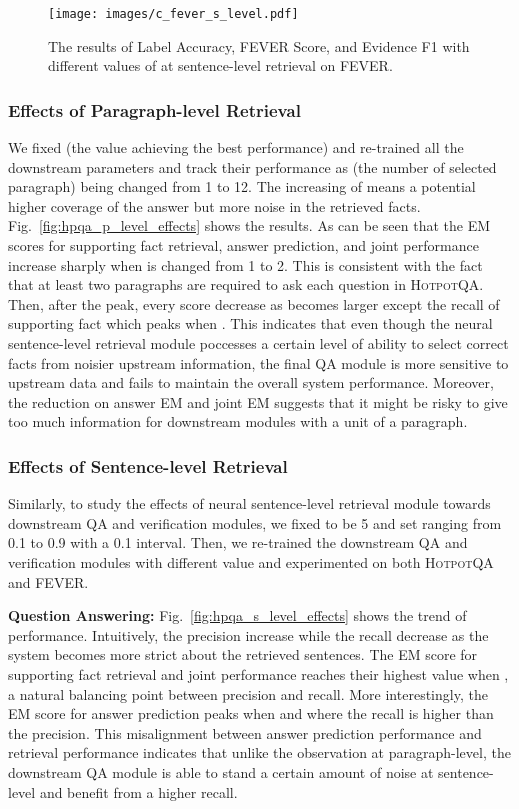\documentclass[11pt,a4paper]{article}
\newcommand\fever{FEVER\xspace}
\newcommand\hpqa{\textsc{HotpotQA}\xspace}
\begin{document}
\begin{figure}[t]
	\centering
    \texttt{[image: images/c\_fever\_s\_level.pdf]}
    \vspace{-5pt}
    \caption{The results of Label Accuracy, FEVER Score, and Evidence F1 with different values of  at sentence-level retrieval on \fever.
    \label{fig:fever_s_level_effects}}
    \vspace{-5pt}
\end{figure}

\subsubsection{Effects of Paragraph-level Retrieval}
We fixed  (the value achieving the best performance) and re-trained all the downstream parameters and track their performance as  (the number of selected paragraph) being changed from 1 to 12. The increasing of  means a potential higher coverage of the answer but more noise in the retrieved facts.
Fig.~\ref{fig:hpqa_p_level_effects} shows the results. As can be seen that the EM scores for supporting fact retrieval, answer prediction, and joint performance increase sharply when  is changed from 1 to 2. This is consistent with the fact that at least two paragraphs are required to ask each question in \hpqa. Then, after the peak, every score decrease as  becomes larger except the recall of supporting fact which peaks when . This indicates that even though the neural sentence-level retrieval module poccesses a certain level of ability to select correct facts from noisier upstream information, the final QA module is more sensitive to upstream data and fails to maintain the overall system performance.
Moreover, the reduction on answer EM and joint EM suggests that it might be risky to give too much information for downstream modules with a unit of a paragraph.

\subsubsection{Effects of Sentence-level Retrieval}
Similarly, to study the effects of neural sentence-level retrieval module towards downstream QA and verification modules, we fixed  to be 5 and set  ranging from 0.1 to 0.9 with a 0.1 interval.
Then, we re-trained the downstream QA and verification modules with different  value and experimented on both \hpqa and \fever.

\noindent \textbf{Question Answering:}
Fig.~\ref{fig:hpqa_s_level_effects} shows the trend of performance.
Intuitively, the precision increase while the recall decrease as the system becomes more strict about the retrieved sentences. The EM score for supporting fact retrieval and joint performance reaches their highest value when , a natural balancing point between precision and recall. More interestingly, the EM score for answer prediction peaks when  and where the recall is higher than the precision. This misalignment between answer prediction performance and retrieval performance indicates that unlike the observation at paragraph-level, the downstream QA module is able to stand a certain amount of noise at sentence-level and benefit from a higher recall.
\end{document}
